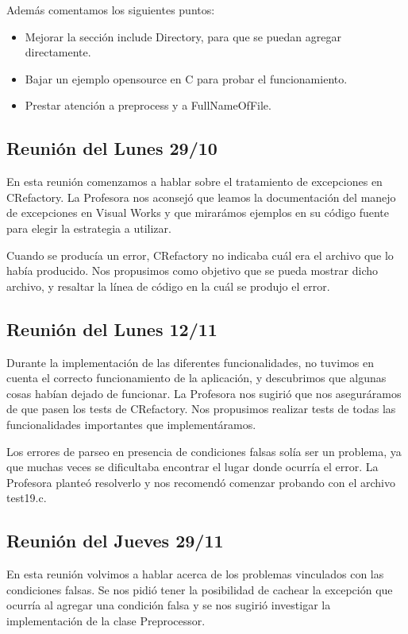 \documentclass[a4paper,oneside,12pt]{article}
\begin{document}
Adem\'as comentamos los siguientes puntos:
\begin{itemize}
 \item Mejorar la secci\'on include Directory, para que se puedan agregar directamente.
 \item Bajar un ejemplo opensource en C para probar el funcionamiento.
 \item Prestar atenci\'on a preprocess y a FullNameOfFile.
\end{itemize}

\subsection{Reuni\'on del Lunes 29/10}
En esta reuni\'on comenzamos a hablar sobre el tratamiento de excepciones en CRefactory. La Profesora nos aconsej\'o que leamos la documentaci\'on del manejo de excepciones en Visual Works y que mirar\'amos ejemplos en su c\'odigo fuente para elegir la estrategia a utilizar.

Cuando se produc\'ia un error, CRefactory no indicaba cu\'al era el archivo que lo hab\'ia producido. Nos propusimos como objetivo que se pueda mostrar dicho archivo, y resaltar la l\'inea de c\'odigo en la cu\'al se produjo el error.

\subsection{Reuni\'on del Lunes 12/11}
Durante la implementaci\'on de las diferentes funcionalidades, no tuvimos en cuenta el correcto funcionamiento de la aplicaci\'on, y descubrimos que algunas cosas hab\'ian dejado de funcionar. La Profesora nos sugiri\'o que nos asegur\'aramos de que pasen los tests de CRefactory. Nos propusimos realizar tests de todas las funcionalidades importantes que implement\'aramos.

Los errores de parseo en presencia de condiciones falsas sol\'ia ser un problema, ya que muchas veces se dificultaba encontrar el lugar donde ocurr\'ia el error. La Profesora plante\'o resolverlo y nos recomend\'o comenzar probando con el archivo test19.c.

\subsection{Reuni\'on del Jueves 29/11}
En esta reuni\'on volvimos a hablar acerca de los problemas vinculados con las condiciones falsas. Se nos pidi\'o tener la posibilidad de cachear la excepci\'on que ocurr\'ia al agregar una condici\'on falsa y se nos sugiri\'o investigar la implementaci\'on de la clase Preprocessor.
\end{document}
